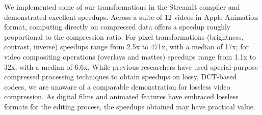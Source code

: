 We implemented some of our transformations in the StreamIt compiler
and demonstrated excellent speedups.  Across a suite of 12 videos in
Apple Animation format, computing directly on compressed data offers a
speedup roughly proportional to the compression ratio.  For pixel
transformations (brightness, contrast, inverse) speedups range from
2.5x to 471x, with a median of 17x; for video compositing operations
(overlays and mattes) speedups range from 1.1x to 32x, with a median
of 6.6x.  While previous researchers have used special-purpose
compressed processing techniques to obtain speedups on lossy,
DCT-based codecs, we are unaware of a comparable demonstration for
lossless video compression.  As digital films and animated features
have embraced lossless formats for the editing process, the speedups
obtained may have practical value.
